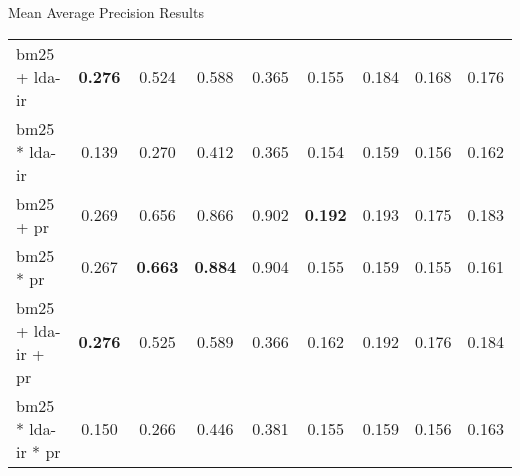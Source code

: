 \begin{frame}{\insertsection}{}
\begin{block}{Mean Average Precision Results}
\begin{table}
{\begin{tabular}{l|c|c|c|c|c|c|c|c}
					\acrshort{bm25} + \acrshort{lda}-\acrshort{ir} & \textbf{0.276} & 0.524 & 0.588 & 0.365 & 0.155 & 0.184 & 0.168 & 0.176 \\
					\acrshort{bm25} * \acrshort{lda}-\acrshort{ir} & 0.139 & 0.270 & 0.412 & 0.365 & 0.154 & 0.159 & 0.156 & 0.162 \\
					\acrshort{bm25} + \acrshort{pr} & 0.269 & 0.656 & 0.866 & 0.902 & \textbf{0.192} & 0.193 & 0.175 & 0.183 \\
					\acrshort{bm25} * \acrshort{pr} & 0.267 & \textbf{0.663} & \textbf{0.884} & 0.904 & 0.155 & 0.159 & 0.155 & 0.161 \\
					\acrshort{bm25} + \acrshort{lda}-\acrshort{ir} + \acrshort{pr} & \textbf{0.276} & 0.525 & 0.589 & 0.366 & 0.162 & 0.192 & 0.176 & 0.184 \\
					\acrshort{bm25} * \acrshort{lda}-\acrshort{ir} * \acrshort{pr} & 0.150 & 0.266 & 0.446 & 0.381 & 0.155 & 0.159 & 0.156 & 0.163 \\
				\end{tabular}
			}
		\end{table}
	\end{block}
\end{frame}

